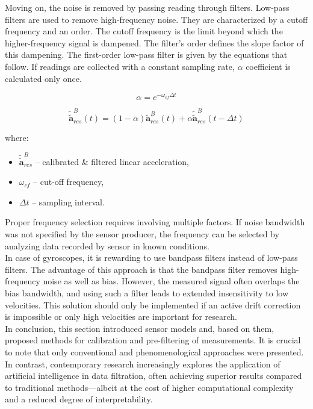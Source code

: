 Moving on, the noise is removed by passing reading through filters. Low-pass filters are used to remove high-frequency noise. They are characterized by a cutoff frequency and an order. The cutoff frequency is the limit beyond which the higher-frequency signal is dampened. The filter’s order defines the slope factor of this dampening. The first-order low-pass filter is given by the equations that follow. If readings are collected with a constant sampling rate, $\alpha$ coefficient is calculated only once.

\begin{equation}
	\alpha = e^{ - \omega_{cf} \varDelta t}
	\label{lpf_alpha}
\end{equation}

\begin{equation}
	\bm{\tilde{\tilde{a}}}_{res}^B(t) = \left( 1 - \alpha \right)  \bm{\tilde{a}}_{res}^B(t) +   \alpha \bm{\tilde{\tilde{a}}}_{res}^B(t - \varDelta t)
	\label{lpf}
\end{equation}

where:
\begin{itemize}
	\item $\bm{\tilde{\tilde{a}}}_{res}^B$ -- calibrated \& filtered linear acceleration,
	\item $\omega_{cf}$ -- cut-off frequency,
	\item $\varDelta t$ -- sampling interval.
\end{itemize}

Proper frequency selection requires involving multiple factors. If noise bandwidth was not specified by the sensor producer, the frequency can be selected by analyzing data recorded by sensor in known conditions. \\

In case of gyroscopes, it is rewarding to use bandpass filters instead of low-pass filters. The advantage of this approach is that the bandpass filter removes high-frequency noise as well as bias. However, the measured signal often overlaps the bias bandwidth, and using such a filter leads to extended insensitivity to low velocities. This solution should only be implemented if an active drift correction is impossible or only high velocities are important for research.\\

In conclusion, this section introduced sensor models and, based on them, proposed methods for calibration and pre-filtering of measurements. It is crucial to note that only conventional and phenomenological approaches were presented. In contrast, contemporary research increasingly explores the application of artificial intelligence in data filtration, often achieving superior results compared to traditional methods---albeit at the cost of higher computational complexity and a reduced degree of interpretability.


